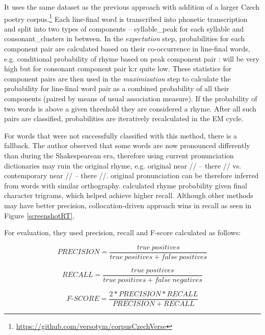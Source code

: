 It uses the same dataset as the previous approach with addition of a larger Czech poetry corpus.\footnote{\url{https://github.com/versotym/corpusCzechVerse}}
Each line-final word is transcribed into phonetic transcription and split into two types of components -- \gls{syllable_peak} for each syllable and \gls{consonant_clusters} in between. In the \textit{expectation} step, probabilities for each component pair are calculated based on their co-occurrence in line-final words, e.g.  conditional probability of  rhyme based on peak component pair : will be very high but for consonant component pair k:r quite low. These statistics for component pairs are then used in the \textit{maximization} step to calculate the probability for line-final word pair as a combined probability of all their components (paired by means of usual association measure).
If the probability of two words is above a given threshold they are considered a rhyme. After all such pairs are classified, probabilities are iteratively recalculated in the EM cycle. 

For words that were not successfully classified with this method, there is a fallback. The author observed that some words are now pronounced differently than during the Shakespearean era, therefore using current pronunciation dictionaries may ruin the original rhyme, e.g. original near // -- there // vs. contemporary near // -- there //.  original pronunciation can be therefore inferred from words with similar orthography.  calculated rhyme probability given final character trigrams, which helped achieve higher recall. Although other methods may have better precision, collocation-driven approach wins in recall as seen in Figure \ref{screenshotRT}. 

For evaluation, they used precision, recall and F-score calculated as follows:

\[PRECISION=\frac{true\ positives}{true\ positives+false\ positives}\]

\[RECALL=\frac{true\ positives}{true\ positives+false\ negatives}\]

\[F\textrm{-}SCORE=\frac{2*PRECISION*RECALL}{PRECISION+RECALL}\]

